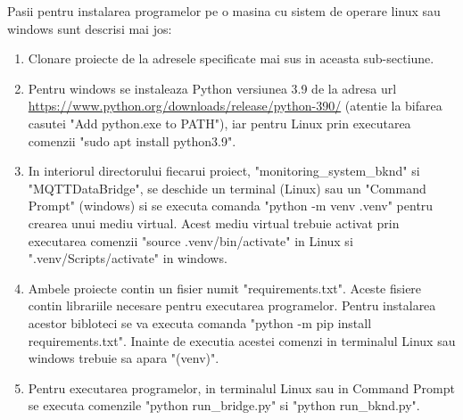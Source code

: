Pasii pentru instalarea programelor pe o masina cu sistem de operare linux sau windows sunt descrisi mai jos:
\begin{enumerate}
    \item Clonare proiecte de la adresele specificate mai sus in aceasta sub-sectiune.
    \item Pentru windows se instaleaza Python versiunea 3.9 de la adresa url \url{https://www.python.org/downloads/release/python-390/} (atentie la bifarea casutei 
    "Add python.exe to PATH"), iar pentru Linux prin executarea comenzii "sudo apt install python3.9".
    \item In interiorul directorului fiecarui proiect, "monitoring\_system\_bknd" si "MQTTDataBridge", se deschide un terminal (Linux) sau un "Command Prompt" (windows) si 
    se executa comanda "python -m venv .venv" pentru crearea unui mediu virtual. Acest mediu virtual trebuie activat prin executarea comenzii "source .venv/bin/activate" 
    in Linux si ".venv/Scripts/activate" in windows. 
    \item Ambele proiecte contin un fisier numit "requirements.txt". Aceste fisiere contin librariile necesare pentru executarea programelor. Pentru instalarea acestor 
    bibloteci se va executa comanda "python -m pip install requirements.txt". Inainte de executia acestei comenzi in terminalul Linux sau windows trebuie sa apara "(venv)".
    \item Pentru executarea programelor, in terminalul Linux sau in Command Prompt se executa comenzile "python run\_bridge.py" si "python run\_bknd.py".
\end{enumerate}

